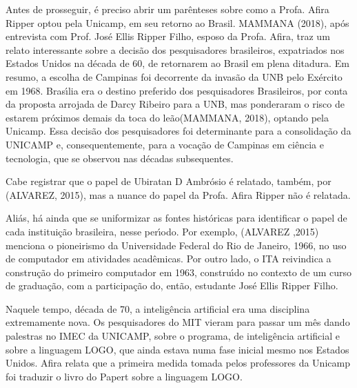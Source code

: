 \documentclass[
12pt,		%
openright,	%
twoside,  %
a4paper,			%
chapter=TITLE,		%
english,			%
french,				%
spanish,			%
brazil				%
]{USPSC-classe/USPSC}
\begin{document}
Antes de prosseguir, \'e preciso abrir um par\^enteses sobre como a Profa. Afira Ripper optou pela Unicamp, em seu retorno ao Brasil.  MAMMANA (2018), ap\'os entrevista com Prof. Jos\'e Ellis Ripper Filho, esposo da Profa. Afira, traz um relato interessante sobre a decis\~ao dos pesquisadores brasileiros, expatriados nos Estados Unidos na d\'ecada de 60, de retornarem ao Brasil em plena ditadura. Em resumo, a escolha de Campinas foi decorrente da invas\~ao da UNB pelo Ex\'ercito em 1968. Bras\'{\i}lia era o destino preferido dos pesquisadores Brasileiros, por conta da proposta arrojada de Darcy Ribeiro para a UNB, mas ponderaram o risco de estarem pr\'oximos demais da \textquotedbl toca do le\~ao\textquotedbl   (MAMMANA, 2018), optando pela Unicamp. Essa decis\~ao dos pesquisadores foi determinante para a consolida\c{c}\~ao da UNICAMP e, consequentemente, para a voca\c{c}\~ao de Campinas em ci\^encia e tecnologia, que se observou nas d\'ecadas subsequentes.









Cabe registrar que o papel de Ubiratan D Ambr\'osio \'e relatado, tamb\'em, por (ALVAREZ, 2015), mas a nuance do papel da Profa. Afira Ripper n\~ao \'e relatada.









Ali\'as, h\'a ainda que se uniformizar as fontes hist\'oricas para identificar o papel de cada institui\c{c}\~ao brasileira, nesse per\'{\i}odo. Por exemplo, (ALVAREZ ,2015) menciona o pioneirismo da Universidade Federal do Rio de Janeiro, 1966, no uso de computador em atividades acad\^emicas. Por outro lado, o ITA reivindica a constru\c{c}\~ao do primeiro computador em 1963, constru\'{\i}do no contexto de um curso de gradua\c{c}\~ao, com a participa\c{c}\~ao do, ent\~ao, estudante Jos\'e Ellis Ripper Filho.









Naquele tempo, d\'ecada de 70, a intelig\^encia artificial era uma disciplina extremamente nova. Os pesquisadores do MIT vieram para passar um m\^es dando palestras no IMEC da UNICAMP, sobre o programa, de intelig\^encia artificial e sobre a linguagem LOGO, que ainda estava numa fase inicial mesmo nos Estados Unidos. Afira relata que a primeira medida tomada pelos professores da Unicamp foi traduzir o livro do Papert sobre a linguagem LOGO.
\end{document}
